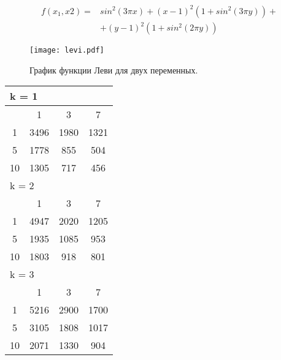 \begin{equation}
\label{levi_eq}
\begin{split}
f(x_1, x2) = &sin^2(3\pi x) + (x - 1)^2(1 + sin^2(3\pi y)) + \\
& + (y - 1)^2(1 + sin^2(2\pi y))
\end{split}
\end{equation}

\begin{figure}
    \centering
    \texttt{[image: levi.pdf]}
    \caption{График функции Леви для двух переменных.}
    \label{levi_plot}
\end{figure}

\begin{table}
\begin{tabular}{|*4{c|}}
\hline
\multicolumn{4}{|l|}{k = 1} \\
\hline
\diagbox{$\mu$}{$\lambda$} & \multicolumn{1}{c|}{1} & \multicolumn{1}{c|}{3} & \multicolumn{1}{c|}{7} \\
\hline
1 & 3496 & 1980 & 1321 \\
\hline
5 & 1778 & 855 & 504 \\
\hline
10 & 1305 & 717 & 456 \\
\hline
\multicolumn{4}{|l|}{k = 2} \\
\hline
\diagbox{$\mu$}{$\lambda$} & \multicolumn{1}{c|}{1} & \multicolumn{1}{c|}{3} & \multicolumn{1}{c|}{7} \\
\hline
1 & 4947 & 2020 & 1205 \\
\hline
5 & 1935 & 1085 & 953 \\
\hline
10 & 1803 & 918 & 801 \\
\hline
\multicolumn{4}{|l|}{k = 3} \\
\hline
\diagbox{$\mu$}{$\lambda$} & \multicolumn{1}{c|}{1} & \multicolumn{1}{c|}{3} & \multicolumn{1}{c|}{7} \\
\hline
1 & 5216 & 2900 & 1700 \\
\hline
5 & 3105 & 1808 & 1017 \\
\hline
10 & 2071 & 1330 & 904 \\
\hline
\end{tabular}
\end{table}

